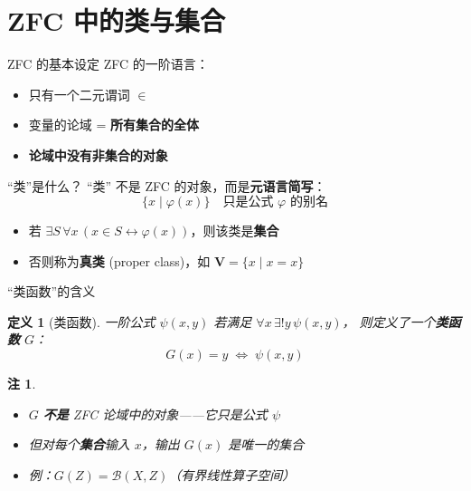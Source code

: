 \documentclass[10pt,aspectratio=169]{beamer}
\newtheorem{dfn}{定义}[section]
\newtheorem{rmk}{注}[section]
\newcommand{\calB}{\mathcal{B}}
\newcommand{\VV}{\mathbf{V}}
\begin{document}
\section{ZFC 中的类与集合}

\begin{frame}{ZFC 的基本设定}
  ZFC 的一阶语言：
  \begin{itemize}
    \item 只有一个二元谓词 $\in$
    \item 变量的论域 = \textbf{所有集合的全体}
    \item \textbf{论域中没有非集合的对象}
  \end{itemize}

  \medskip
  \begin{block}{``类''是什么？}
    ``类'' 不是 ZFC 的对象，而是\textbf{元语言简写}：
    \[
      \{x \mid \varphi(x)\} \quad \text{只是公式 } \varphi \text{ 的别名}
    \]
    \begin{itemize}
      \item 若 $\exists S\, \forall x\, (x \in S \leftrightarrow \varphi(x))$，则该类是\textbf{集合}
      \item 否则称为\textbf{真类} (proper class)，如 $\VV = \{x \mid x = x\}$
    \end{itemize}
  \end{block}
\end{frame}

\begin{frame}{``类函数''的含义}
  \begin{dfn}[类函数]
    一阶公式 $\psi(x, y)$ 若满足 $\forall x\, \exists! y\, \psi(x, y)$，
    则定义了一个\textbf{类函数} $G$：
    \[
      G(x) = y \;\iff\; \psi(x, y)
    \]
  \end{dfn}

  \begin{rmk}
    \begin{itemize}
      \item $G$ \textbf{不是} ZFC 论域中的对象——它只是公式 $\psi$
      \item 但对每个\textbf{集合}输入 $x$，输出 $G(x)$ 是唯一的集合
      \item 例：$G(Z) = \calB(X, Z)$（有界线性算子空间）
    \end{itemize}
  \end{rmk}
\end{frame}
\end{document}
